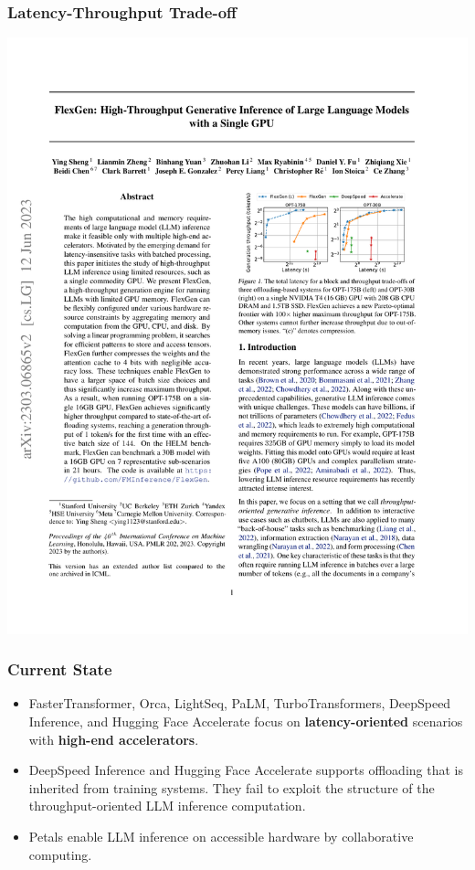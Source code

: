 \documentclass[12pt,aspectratio=169]{beamer}
\begin{document}
    \begin{frame}
        \frametitle{Latency-Throughput Trade-off}

        \centering
        \includegraphics[page=1,trim=314.54bp 475.25bp 79.64bp 200.66bp,clip,scale=1.2]{paper.pdf}
    \end{frame}

    \begin{frame}
        \frametitle{Current State}

        \begin{itemize}
            \setlength{\itemsep}{.8em}
            \item FasterTransformer, Orca, LightSeq, PaLM, TurboTransformers, DeepSpeed Inference, and Hugging Face Accelerate focus on \textbf{latency-oriented} scenarios with \textbf{high-end accelerators}.
            \item DeepSpeed Inference and Hugging Face Accelerate supports offloading that is inherited from training systems. They fail to exploit the structure of the throughput-oriented LLM inference computation.
            \item Petals enable LLM inference on accessible hardware by collaborative computing.
        \end{itemize}
    \end{frame}
\end{document}
